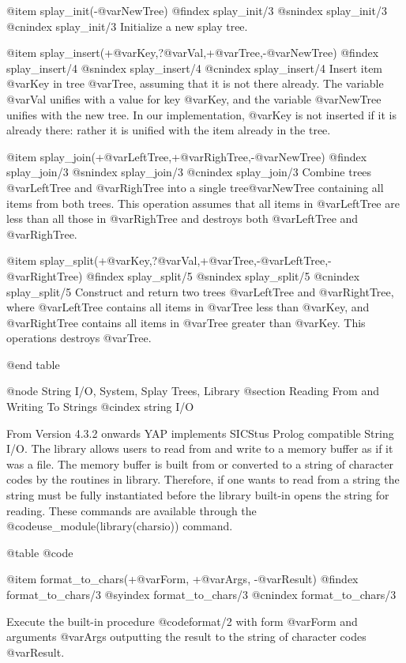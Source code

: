 {{{{{{{{{@item splay_init(-@var{NewTree})
@findex splay_init/3
@snindex splay_init/3
@cnindex splay_init/3
Initialize a new splay tree.

@item splay_insert(+@var{Key},?@var{Val},+@var{Tree},-@var{NewTree})
@findex splay_insert/4
@snindex splay_insert/4
@cnindex splay_insert/4
Insert item @var{Key} in tree @var{Tree}, assuming that it is not
there already. The variable @var{Val} unifies with a value for key
@var{Key}, and the variable @var{NewTree} unifies with the new
tree. In our implementation, @var{Key} is not inserted if it is
already there: rather it is unified with the item already in the tree.

@item splay_join(+@var{LeftTree},+@var{RighTree},-@var{NewTree})
@findex splay_join/3
@snindex splay_join/3
@cnindex splay_join/3
Combine trees @var{LeftTree} and @var{RighTree} into a single
tree@var{NewTree} containing all items from both trees. This operation
assumes that all items in @var{LeftTree} are less than all those in
@var{RighTree} and destroys both @var{LeftTree} and @var{RighTree}.

@item splay_split(+@var{Key},?@var{Val},+@var{Tree},-@var{LeftTree},-@var{RightTree})
@findex splay_split/5
@snindex splay_split/5
@cnindex splay_split/5
Construct and return two trees @var{LeftTree} and @var{RightTree},
where @var{LeftTree} contains all items in @var{Tree} less than
@var{Key}, and @var{RightTree} contains all items in @var{Tree}
greater than @var{Key}. This operations destroys @var{Tree}.

@end table

@node String I/O, System, Splay Trees, Library
@section Reading From and Writing To Strings
@cindex string I/O

From Version 4.3.2 onwards YAP implements SICStus Prolog compatible
String I/O. The library allows users to read from and write to a memory
buffer as if it was a file. The memory buffer is built from or converted
to a string of character codes by the routines in library. Therefore, if
one wants to read from a string the string must be fully instantiated
before the library built-in opens the string for reading. These commands
are available through the @code{use_module(library(charsio))} command.

@table @code

@item format_to_chars(+@var{Form}, +@var{Args}, -@var{Result})
@findex format_to_chars/3
@syindex format_to_chars/3
@cnindex format_to_chars/3

Execute the built-in procedure @code{format/2} with form @var{Form} and
arguments @var{Args} outputting the result to the string of character
codes @var{Result}.

}}}}}}}}}
